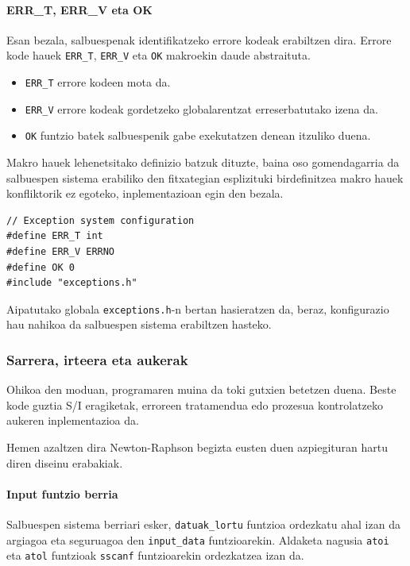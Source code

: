 \documentclass[10pt,a4paper,basque]{article}
\begin{document}
\paragraph{ERR\_{T}, ERR\_{V} eta OK}
Esan bezala, salbuespenak identifikatzeko errore kodeak erabiltzen dira. Errore kode hauek \verb|ERR_T|, \verb|ERR_V| eta \verb|OK| makroekin daude abstraituta.

\begin{itemize}
\item \verb|ERR_T| errore kodeen mota da.
\item \verb|ERR_V| errore kodeak gordetzeko globalarentzat erreserbatutako izena da.
\item \verb|OK| funtzio batek salbuespenik gabe exekutatzen denean itzuliko duena.
\end{itemize}

Makro hauek lehenetsitako definizio batzuk dituzte, baina oso gomendagarria da salbuespen sistema erabiliko den fitxategian esplizituki birdefinitzea makro hauek konfliktorik ez egoteko, inplementazioan egin den bezala.

\begin{lstlisting}
// Exception system configuration
#define ERR_T int
#define ERR_V ERRNO
#define OK 0
#include "exceptions.h"
\end{lstlisting}

Aipatutako globala \verb|exceptions.h|-n bertan hasieratzen da, beraz, konfigurazio hau nahikoa da salbuespen sistema erabiltzen hasteko.

\subsubsection{Sarrera, irteera eta aukerak}

Ohikoa den moduan, programaren muina da toki gutxien betetzen duena. Beste kode guztia S/I eragiketak, erroreen tratamendua edo prozesua kontrolatzeko aukeren inplementazioa da.

Hemen azaltzen dira Newton-Raphson begizta eusten duen azpiegituran hartu diren diseinu erabakiak.

\paragraph{Input funtzio berria}

Salbuespen sistema berriari esker, \verb|datuak_lortu| funtzioa ordezkatu ahal izan da argiagoa eta seguruagoa den \verb|input_data| funtzioarekin. Aldaketa nagusia \verb|atoi| eta \verb|atol| funtzioak \verb|sscanf| funtzioarekin ordezkatzea izan da.
\end{document}
